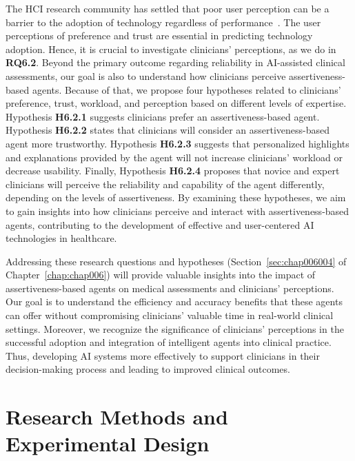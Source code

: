 The \ac{HCI} research community has settled that poor user perception can be a barrier to the adoption of technology regardless of performance~\cite{10.1145/3313831.3376506, 10.1145/3479549}.
The user perceptions of preference and trust are essential in predicting technology adoption.
Hence, it is crucial to investigate clinicians' perceptions, as we do in {\bf RQ6.2}.
Beyond the primary outcome regarding reliability in \ac{AI}-assisted clinical assessments, our goal is also to understand how clinicians perceive assertiveness-based agents.
Because of that, we propose four hypotheses related to clinicians' preference, trust, workload, and perception based on different levels of expertise.
Hypothesis {\bf H6.2.1} suggests clinicians prefer an assertiveness-based agent.
Hypothesis {\bf H6.2.2} states that clinicians will consider an assertiveness-based agent more trustworthy.
Hypothesis {\bf H6.2.3} suggests that personalized highlights and explanations provided by the agent will not increase clinicians' workload or decrease usability.
Finally, Hypothesis {\bf H6.2.4} proposes that novice and expert clinicians will perceive the reliability and capability of the agent differently, depending on the levels of assertiveness.
By examining these hypotheses, we aim to gain insights into how clinicians perceive and interact with assertiveness-based agents, contributing to the development of effective and user-centered \ac{AI} technologies in healthcare.

Addressing these research questions and hypotheses (Section~\ref{sec:chap006004} of Chapter~\ref{chap:chap006}) will provide valuable insights into the impact of assertiveness-based agents on medical assessments and clinicians' perceptions.
Our goal is to understand the efficiency and accuracy benefits that these agents can offer without compromising clinicians' valuable time in real-world clinical settings.
Moreover, we recognize the significance of clinicians' perceptions in the successful adoption and integration of intelligent agents into clinical practice.
Thus, developing \ac{AI} systems more effectively to support clinicians in their decision-making process and leading to improved clinical outcomes.

\section{Research Methods and Experimental Design}
\label{sec:app005006}

